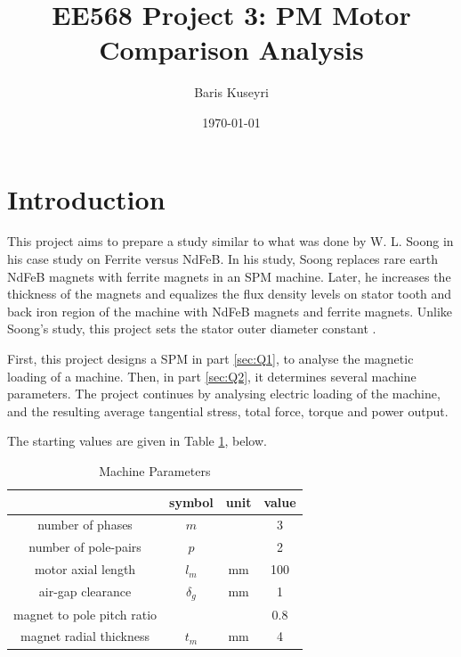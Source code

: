 \documentclass[a4paper, 11pt, titlepage]{article}
\begin{document}
\title{EE568 Project 3: PM Motor Comparison Analysis}
\author{Baris Kuseyri}
\date{\today}
\maketitle

\tableofcontents
\newpage

\section{Introduction}
\label{sec:intro}

This project aims to prepare a study similar to what was done by W. L. Soong in his case study on Ferrite versus NdFeB. In his study, Soong replaces rare earth NdFeB magnets with ferrite magnets in an SPM machine. Later, he increases the thickness of the magnets and equalizes the flux density levels on stator tooth and back iron region of the machine with NdFeB magnets and ferrite magnets. Unlike Soong's study, this project sets the stator outer diameter constant \cite{soong}.

First, this project designs a SPM in part \ref{sec:Q1}, to analyse the magnetic loading of a machine. Then, in part \ref{sec:Q2}, it determines several machine parameters. The project continues by analysing electric loading of the machine, and the resulting average tangential stress, total force, torque and power output.

The starting values are given in Table \ref{table:machineParameters}, below.

\begin{table}[ht]
	\begin{center}
		\begin{tabular}{c|c|c|c}
			 & symbol & unit & value \\
			\hline
			number of phases & $m$ & & 3 \\
			number of pole-pairs & $p$ & & 2 \\
			motor axial length & $l_m$ & mm & 100 \\ 
			air-gap clearance & $\delta_g$ & mm & 1 \\
			magnet to pole pitch ratio & & & 0.8 \\
			magnet radial thickness & $t_m$ & mm & 4 \\
			\hline
		\end{tabular}
	\end{center}
	\caption{Machine Parameters}
	\label{table:machineParameters}
\end{table}
\end{document}
